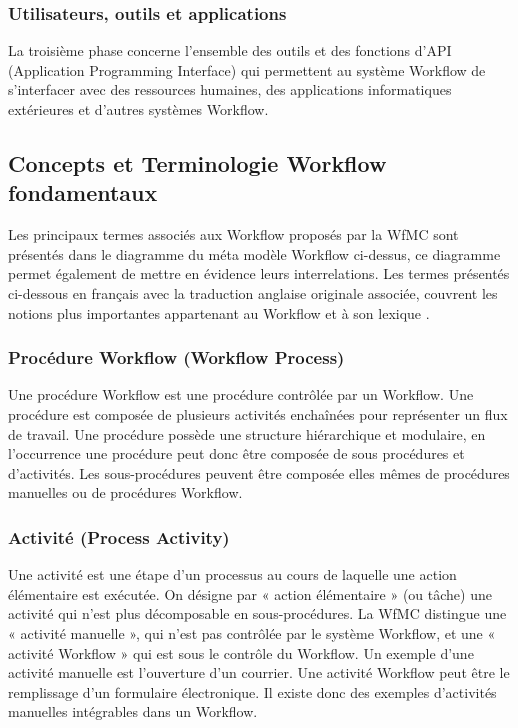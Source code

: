  	  	  	 \subsubsection{ Utilisateurs, outils et applications }
 	  	  	 La troisième phase concerne l’ensemble des outils et des fonctions d’API (Application Programming Interface) qui permettent au système Workflow de s’interfacer avec des ressources humaines, des applications informatiques extérieures et d’autres systèmes Workflow. 
 	  	  	 
 	 
 	 
 	 
 
 	 
 	 
 	\subsection{Concepts et Terminologie Workflow fondamentaux } 
 	 
 	 Les principaux termes associés aux Workflow proposés par la WfMC \parencite{WFMC11} sont présentés dans le diagramme du méta modèle Workflow ci-dessus, ce diagramme permet également de mettre en évidence leurs interrelations. Les termes présentés ci-dessous en français avec la traduction anglaise originale associée, couvrent les notions plus importantes appartenant au Workflow et à son lexique \parencite{WFMC11}. 
 	 
 	 \subsubsection{Procédure Workflow (Workflow Process) }
 	 
 	 Une procédure Workflow est une procédure contrôlée par un Workflow. Une procédure est composée de plusieurs activités enchaînées pour représenter un flux de travail. Une procédure possède une structure hiérarchique et modulaire, en l’occurrence une procédure peut donc être composée de sous procédures et d’activités. Les sous-procédures peuvent être composée elles mêmes de procédures manuelles ou de procédures Workflow.
 	 
 	 
 	 \subsubsection{Activité (Process Activity) }
 	 Une activité est une étape d’un processus au cours de laquelle une action élémentaire est exécutée. On désigne par « action élémentaire » (ou tâche) une activité qui n’est plus décomposable en sous-procédures. La WfMC distingue une « activité manuelle », qui n’est pas contrôlée par le système Workflow, et une « activité Workflow » qui est sous le contrôle du Workflow. Un exemple d’une activité manuelle est l’ouverture d’un courrier. Une activité Workflow peut être le remplissage d’un formulaire électronique. Il existe donc des exemples d’activités manuelles intégrables dans un Workflow. 
 	 
